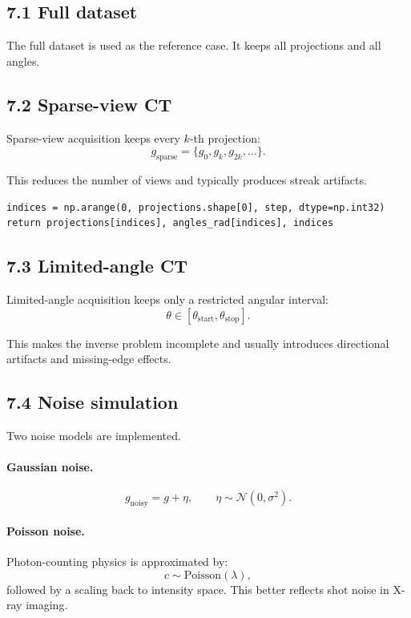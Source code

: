\documentclass[12pt,a4paper]{article}
\begin{document}
\subsection*{7.1 Full dataset}
The full dataset is used as the reference case. It keeps all projections and all angles.

\subsection*{7.2 Sparse-view CT}
Sparse-view acquisition keeps every $k$-th projection:
\[
g_{\text{sparse}} = \{g_0, g_k, g_{2k}, \dots\}.
\]

This reduces the number of views and typically produces streak artifacts.

\begin{lstlisting}[style=py,caption={Sparse-view selection}]
indices = np.arange(0, projections.shape[0], step, dtype=np.int32)
return projections[indices], angles_rad[indices], indices
\end{lstlisting}

\subsection*{7.3 Limited-angle CT}
Limited-angle acquisition keeps only a restricted angular interval:
\[
\theta \in [\theta_{\text{start}}, \theta_{\text{stop}}].
\]

This makes the inverse problem incomplete and usually introduces directional artifacts and missing-edge effects.

\subsection*{7.4 Noise simulation}
Two noise models are implemented.

\paragraph{Gaussian noise.}
\[
g_{\text{noisy}} = g + \eta,\qquad \eta \sim \mathcal{N}(0,\sigma^2).
\]

\paragraph{Poisson noise.}
Photon-counting physics is approximated by:
\[
c \sim \text{Poisson}(\lambda),
\]
followed by a scaling back to intensity space. This better reflects shot noise in X-ray imaging.
\end{document}
